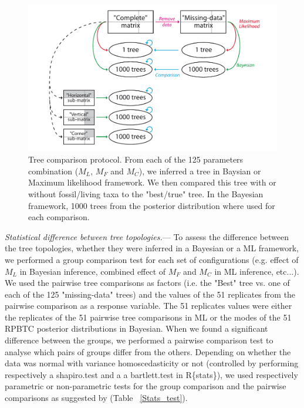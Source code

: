 \documentclass[12pt,letterpaper]{article}
\renewcommand{\subsubsection}[1]{%
\vspace{2ex}
\noindent
\textit{#1.}---}
\begin{document}
\begin{figure} %
\centering
\includegraphics[keepaspectratio=true]{Figures/TEM_Fig_TreeCmp.pdf}
\caption{Tree comparison protocol.
From each of the 125 parameters combination ($M_L$, $M_F$ and $M_C$), we inferred a tree in Baysian or Maximum likelihood framework.
We then compared this tree with or without fossil/living taxa to the "best/true" tree.
In the Bayesian framework, 1000 trees from the posterior distribution where used for each comparison.}
\label{Fig_Compare}
\end{figure}

\subsubsection{Statistical difference between tree topologies}
To assess the difference between the tree topologies, whether they were inferred in a Bayesian or a ML framework, we performed a group comparison test for each set of configurations (e.g. effect of $M_L$ in Bayesian inference, combined effect of $M_F$ and $M_C$ in ML inference, etc...).
We used the pairwise tree comparisons as factors (i.e. the "Best" tree vs. one of each of the 125 "missing-data" trees) and the values of the 51 replicates from the pairwise comparison as a response variable.
The 51 replicates values were either the replicates of the 51 pairwise tree comparisons in ML or the modes of the 51 RPBTC posterior distributions in Bayesian.
When we found a significant difference between the groups, we performed a pairwise comparison test to analyse which pairs of groups differ from the others.
Depending on whether the data was normal with variance homoscedasticity or not (controlled by performing respectively a shapiro.test and a a bartlett.test in R\{stats\}), we used respectively parametric or non-parametric tests for the group comparison and the pairwise comparisons as suggested by \citet{ruxtontime2008} (Table ~\ref{Stats_test}). %
\end{document}
